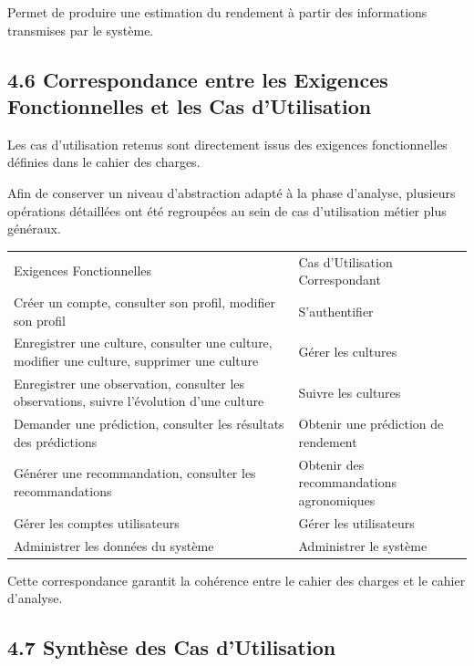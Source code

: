 \documentclass[
]{article}
\begin{document}
Permet de produire une estimation du rendement à partir des informations
transmises par le système.

\hypertarget{correspondance-entre-les-exigences-fonctionnelles-et-les-cas-dutilisation}{%
\subsection{4.6 Correspondance entre les Exigences Fonctionnelles et les
Cas
d'Utilisation}\label{correspondance-entre-les-exigences-fonctionnelles-et-les-cas-dutilisation}}

Les cas d'utilisation retenus sont directement issus des exigences
fonctionnelles définies dans le cahier des charges.

Afin de conserver un niveau d'abstraction adapté à la phase d'analyse,
plusieurs opérations détaillées ont été regroupées au sein de cas
d'utilisation métier plus généraux.

\begin{longtable}[]{@{}ll@{}}
\toprule
\endhead
Exigences Fonctionnelles & Cas d'Utilisation Correspondant \\
Créer un compte, consulter son profil, modifier son profil &
S'authentifier \\
Enregistrer une culture, consulter une culture, modifier une culture,
supprimer une culture & Gérer les cultures \\
Enregistrer une observation, consulter les observations, suivre
l'évolution d'une culture & Suivre les cultures \\
Demander une prédiction, consulter les résultats des prédictions &
Obtenir une prédiction de rendement \\
Générer une recommandation, consulter les recommandations & Obtenir des
recommandations agronomiques \\
Gérer les comptes utilisateurs & Gérer les utilisateurs \\
Administrer les données du système & Administrer le système \\
\bottomrule
\end{longtable}

Cette correspondance garantit la cohérence entre le cahier des charges
et le cahier d'analyse.

\hypertarget{synthuxe8se-des-cas-dutilisation}{%
\subsection{4.7 Synthèse des Cas
d'Utilisation}\label{synthuxe8se-des-cas-dutilisation}}
\end{document}
